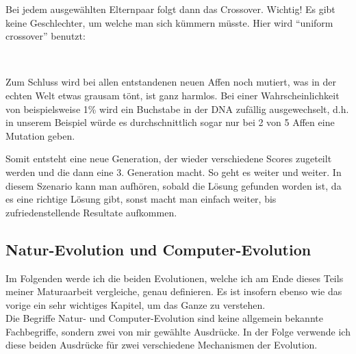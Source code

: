 \documentclass[11pt,a4paper,ngerman]{article}
\begin{document}
Bei jedem ausgewählten Elternpaar folgt dann das Crossover. Wichtig! Es gibt keine Geschlechter, um welche man sich kümmern müsste. Hier wird \enquote{uniform crossover} benutzt:\\

\begin{addmargin}[2em]{0em}
\\
\end{addmargin}

Zum Schluss wird bei allen entstandenen neuen Affen noch mutiert, was in der echten Welt etwas grausam tönt, ist ganz harmlos. Bei einer Wahrscheinlichkeit von beispielsweise 1\% wird ein Buchstabe in der DNA zufällig ausgewechselt, d.h. in unserem Beispiel würde es durchschnittlich sogar nur bei 2 von 5 Affen eine Mutation geben.\\


Somit entsteht eine neue Generation, der wieder verschiedene Scores zugeteilt werden und die dann eine 3. Generation macht. So geht es weiter und weiter. In diesem Szenario kann man aufhören, sobald die Lösung gefunden worden ist, da es eine richtige Lösung gibt, sonst macht man einfach weiter, bis zufriedenstellende Resultate aufkommen.

\subsection{Natur-Evolution und Computer-Evolution}

Im Folgenden werde ich die beiden Evolutionen, welche ich am Ende dieses Teils meiner Maturaarbeit vergleiche, genau definieren. Es ist insofern ebenso wie das vorige ein sehr wichtiges Kapitel, um das Ganze zu verstehen.\\

Die Begriffe Natur- und Computer-Evolution sind keine allgemein bekannte Fachbegriffe, sondern zwei von mir gewählte Ausdrücke. In der Folge verwende ich diese beiden Ausdrücke für zwei verschiedene Mechanismen der Evolution.\\
\end{document}
